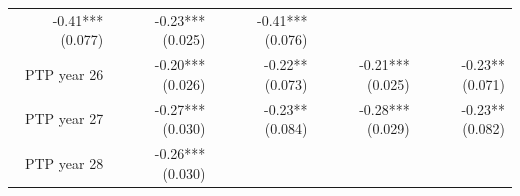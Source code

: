 \documentclass[]{article}
\begin{document}
\begin{longtable}[c]{@{}rrrrr@{}}
\begin{minipage}[t]{0.16\columnwidth}
-0.41*** (0.077)
\strut\end{minipage} &
\begin{minipage}[t]{0.21\columnwidth}\raggedleft\strut
-0.23*** (0.025)
\strut\end{minipage} &
\begin{minipage}[t]{0.15\columnwidth}\raggedleft\strut
-0.41*** (0.076)
\strut\end{minipage}\tabularnewline
\begin{minipage}[t]{0.17\columnwidth}\raggedleft\strut
PTP year 26
\strut\end{minipage} &
\begin{minipage}[t]{0.18\columnwidth}\raggedleft\strut
-0.20*** (0.026)
\strut\end{minipage} &
\begin{minipage}[t]{0.16\columnwidth}\raggedleft\strut
-0.22** (0.073)
\strut\end{minipage} &
\begin{minipage}[t]{0.21\columnwidth}\raggedleft\strut
-0.21*** (0.025)
\strut\end{minipage} &
\begin{minipage}[t]{0.15\columnwidth}\raggedleft\strut
-0.23** (0.071)
\strut\end{minipage}\tabularnewline
\begin{minipage}[t]{0.17\columnwidth}\raggedleft\strut
PTP year 27
\strut\end{minipage} &
\begin{minipage}[t]{0.18\columnwidth}\raggedleft\strut
-0.27*** (0.030)
\strut\end{minipage} &
\begin{minipage}[t]{0.16\columnwidth}\raggedleft\strut
-0.23** (0.084)
\strut\end{minipage} &
\begin{minipage}[t]{0.21\columnwidth}\raggedleft\strut
-0.28*** (0.029)
\strut\end{minipage} &
\begin{minipage}[t]{0.15\columnwidth}\raggedleft\strut
-0.23** (0.082)
\strut\end{minipage}\tabularnewline
\begin{minipage}[t]{0.17\columnwidth}\raggedleft\strut
PTP year 28
\strut\end{minipage} &
\begin{minipage}[t]{0.18\columnwidth}\raggedleft\strut
-0.26*** (0.030)
\strut\end{minipage} &
\begin{minipage}[t]{0.16\columnwidth}\raggedleft\strut

\end{minipage}
\end{longtable}
\end{document}
